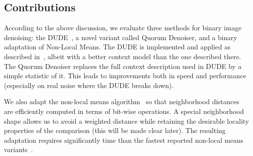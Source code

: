 \documentclass{article}
\begin{document}
\subsection{Contributions}

According to the above discussion, we evaluate three methods for binary image denoising: the  DUDE~\cite{dude-bin}, a novel variant called Quorum Denoiser, and a binary adaptation of Non-Local Means.  The DUDE is implemented and applied as described in~\cite{dude-bin}, albeit with a better context model than the one described there. The Quorum Denoiser replaces the full context description used in DUDE by a simple statistic of it. This leads to improvements both in speed and performance (especially on real noise where the DUDE breaks down).

We also adapt the non-local means algorithm~\cite{nlm} so that neighborhood distances are efficiently computed in terms of bit-wise operations. A special neighborhood shape allows us to avoid a weighted distance while retaining the desirable locality properties of the comparison (this will be made clear later). The resulting adaptation requires significantly time than the fastest reported non-local means variants~\cite{fast-nlm}.



\end{document}
